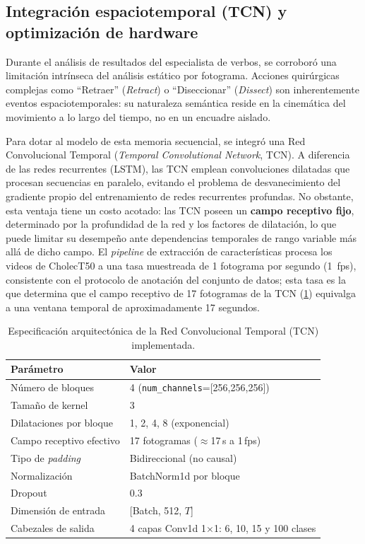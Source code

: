 \documentclass[11pt]{article}
\begin{document}
\subsection{Integración espaciotemporal (TCN) y optimización de hardware}
\label{sec:tcn}

Durante el análisis de resultados del especialista de verbos, se corroboró una limitación intrínseca del análisis estático por fotograma. Acciones quirúrgicas complejas como ``Retraer'' (\emph{Retract}) o ``Diseccionar'' (\emph{Dissect}) son inherentemente eventos espaciotemporales: su naturaleza semántica reside en la cinemática del movimiento a lo largo del tiempo, no en un encuadre aislado.

Para dotar al modelo de esta memoria secuencial, se integró una Red Convolucional Temporal (\emph{Temporal Convolutional Network}, TCN). A diferencia de las redes recurrentes (LSTM), las TCN emplean convoluciones dilatadas que procesan secuencias en paralelo, evitando el problema de desvanecimiento del gradiente propio del entrenamiento de redes recurrentes profundas. No obstante, esta ventaja tiene un costo acotado: las TCN poseen un \textbf{campo receptivo fijo}, determinado por la profundidad de la red y los factores de dilatación, lo que puede limitar su desempeño ante dependencias temporales de rango variable más allá de dicho campo. El \emph{pipeline} de extracción de características procesa los videos de CholecT50 a una tasa muestreada de 1 fotograma por segundo (1~fps), consistente con el protocolo de anotación del conjunto de datos; esta tasa es la que determina que el campo receptivo de 17 fotogramas de la TCN (\cref{tab:tcn}) equivalga a una ventana temporal de aproximadamente 17 segundos.

\begin{table}[htbp]
    \centering
    \caption{Especificación arquitectónica de la Red Convolucional Temporal (TCN) implementada.}
    \label{tab:tcn}
    \small
    \begin{tabular}{@{}ll@{}}
        \toprule
        \textbf{Parámetro} & \textbf{Valor} \\
        \midrule
        Número de bloques & 4 (\texttt{num\_channels}=[256,256,256]) \\
        Tamaño de kernel & 3 \\
        Dilataciones por bloque & 1, 2, 4, 8 (exponencial) \\
        Campo receptivo efectivo & 17 fotogramas ($\approx$17\,s a 1\,fps) \\
        Tipo de \emph{padding} & Bidireccional (no causal) \\
        Normalización & BatchNorm1d por bloque \\
        Dropout & 0.3 \\
        Dimensión de entrada & [Batch, 512, $T$] \\
        Cabezales de salida & 4 capas Conv1d 1$\times$1: 6, 10, 15 y 100 clases \\
        \bottomrule
    \end{tabular}
\end{table}
\end{document}
